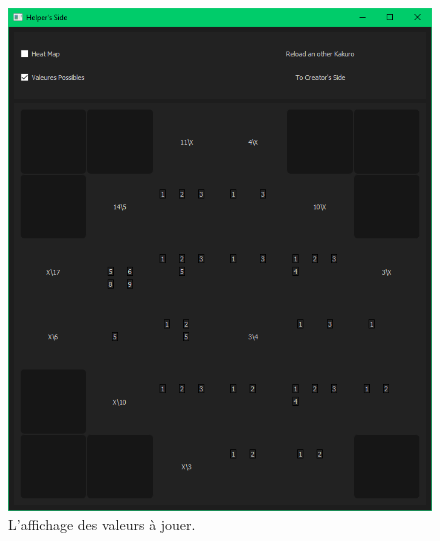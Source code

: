 \documentclass[french,12pt]{article}
\begin{document}
\begin{figure}[ht]
  \begin{center}
    \includegraphics[width=\textwidth]{./ressources/valPoss.png} 
  \end{center}
  \caption{L'affichage des valeurs à jouer.}
\end{figure}
\end{document}
